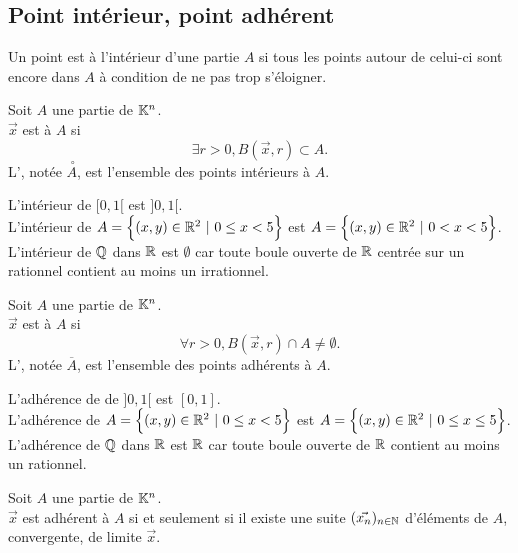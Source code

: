 \documentclass{book}
\begin{document}
\subsection{Point intérieur, point adhérent}
Un point est à l'intérieur d'une partie $A$ si tous les points autour de celui-ci sont encore dans $A$ à condition de ne pas trop s'éloigner.
\begin{Definition}[Intérieur]
Soit $A$ une partie de $\mathbb{K}^n$.\\
$\vec{x}$ est  à $A$ si $$\exists  r > 0, B (\vec{x}, r) \subset A.$$
L', notée $\stackrel {\ \circ }{A}$, est l'ensemble des points intérieurs à $A$.\\
\end{Definition}
\begin{Exemple}
L'intérieur de $[0,1[$ est $]0,1[$.\\
L'intérieur de  $A  =\Big\{(x,y)\in\R^2\ |\ 0\leq x<5 \Big\}$ est  
$A  =\Big\{(x,y)\in\mathbb{R}^2\ |\ 0< x<5 \Big\}$.\\
L'intérieur de $\mathbb{Q}$ dans $\mathbb{R}$ est $\emptyset$ car  toute boule ouverte de $\mathbb{R}$ centrée sur un rationnel contient au moins un irrationnel.
\end{Exemple}
\begin{Definition}[Adhérent]
Soit $A$ une partie de $\mathbb{K}^n$.\\
$\vec{x}$ est  à $A$ si $$\forall  r > 0, B (\vec{x}, r) \cap A\neq \emptyset .$$
L', notée $\overline {A}$, est l'ensemble des points adhérents à $A$.\\
\end{Definition}
\begin{Exemple}
L'adhérence de de $]0,1[$ est $[0,1]$.\\
L'adhérence de  $A  =\Big\{(x,y)\in\R^2\ |\ 0\leq x<5 \Big\}$ est  
$A  =\Big\{(x,y)\in\mathbb{R}^2\ |\ 0\leq x\leq5 \Big\}$.\\
L'adhérence de $\mathbb{Q}$ dans $\mathbb{R}$ est $\mathbb{R}$ car  toute boule ouverte de $\mathbb{R}$ contient au moins un rationnel.
\end{Exemple}
\begin{Proposition}
Soit $A$ une partie de $\mathbb{K}^n$.\\
$\vec{x}$ est adhérent à $A$ si et seulement si il existe une suite $(\vec{x_n})_{n\in\mathbb{N}}$
d'éléments de $A$, convergente, de limite $\vec{x}$.
\end{Proposition}
\end{document}
